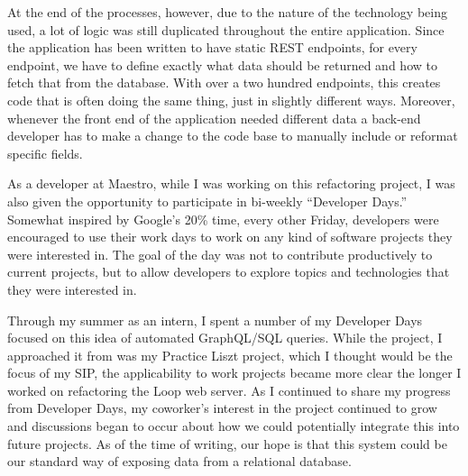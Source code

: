 At the end of the processes, however, due to the nature of the technology being used, a lot of logic was still duplicated throughout the entire application.  Since the application has been written to have static REST endpoints, for every endpoint, we have to define exactly what data should be returned and how to fetch that from the database. With over a two hundred endpoints, this creates code that is often doing the same thing, just in slightly different ways.  Moreover, whenever the front end of the application needed different data a back-end developer has to make a change to the code base to manually include or reformat specific fields.

As a developer at Maestro, while I was working on this refactoring project, I was also given the opportunity to participate in bi-weekly ``Developer Days.''  Somewhat inspired by Google's 20\% time, every other Friday, developers were encouraged to use their work days to work on any kind of software projects they were interested in.  The goal of the day was not to contribute productively to current projects, but to allow developers to explore topics and technologies that they were interested in.

Through my summer as an intern, I spent a number of my Developer Days focused on this idea of automated GraphQL/SQL queries. While the project, I approached it from was my Practice Liszt project, which I thought would be the focus of my SIP, the applicability to work projects became more clear the longer I worked on refactoring the Loop web server.  As I continued to share my progress from Developer Days, my coworker's interest in the project continued to grow and discussions began to occur about how we could potentially integrate this into future projects.  As of the time of writing, our hope is that this system could be our standard way of exposing data from a relational database.